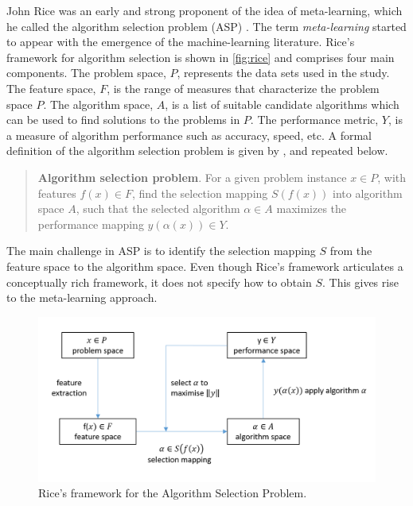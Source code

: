 \documentclass[11pt,a4paper,]{article}
\begin{document}
John Rice was an early and strong proponent of the idea of meta-learning, which he called the algorithm selection problem (ASP) \autocite{rice1976}. The term \emph{meta-learning} started to appear with the emergence of the machine-learning literature. Rice's framework for algorithm selection is shown in \autoref{fig:rice} and comprises four main components. The problem space, \(P\), represents the data sets used in the study. The feature space, \(F\), is the range of measures that characterize the problem space \(P\). The algorithm space, \(A\), is a list of suitable candidate algorithms which can be used to find solutions to the problems in \(P\). The performance metric, \(Y\), is a measure of algorithm performance such as accuracy, speed, etc. A formal definition of the algorithm selection problem is given by \textcite{smith2009cross}, and repeated below.

\begin{quote}
\textbf{Algorithm selection problem}. For a given problem instance \(x \in P\), with features \(f(x) \in F\), find the selection mapping \(S(f(x))\) into algorithm space \(A\), such that the selected algorithm \(\alpha \in A\) maximizes the performance mapping \(y(\alpha(x)) \in Y\).
\end{quote}

The main challenge in ASP is to identify the selection mapping \(S\) from the feature space to the algorithm space. Even though Rice's framework articulates a conceptually rich framework, it does not specify how to obtain \(S\). This gives rise to the meta-learning approach.

\begin{figure}

{\centering \includegraphics[width=0.8\linewidth]{images/RiceFramework} 

}

\caption{Rice's framework for the Algorithm Selection Problem.}\label{fig:rice}
\end{figure}
\end{document}
